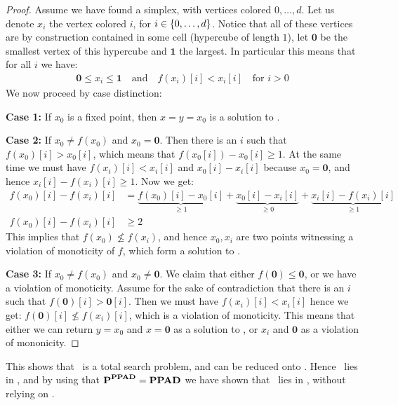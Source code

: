 \begin{proof}
    Assume we have found a simplex, with vertices colored $0, \dots, d$. Let us denote $x_i$ the vertex colored $i$, for $i \in \left\{0, \dots, d\right\}$. Notice that all of these vertices are by construction contained in some cell (hypercube of length $1$), let $\mathbf{0}$ be the smallest vertex of this hypercube and $\mathbf{1}$ the largest. In particular this means that for all $i$ we have:
    \begin{align*}
        \mathbf{0} \leq x_i \leq \mathbf{1} \quad \text{and} \quad f(x_i)[i] < x_i[i] \quad \text{for $i > 0$}
    \end{align*}
    We now proceed by case distinction:

    \textbf{Case 1:} If $x_0$ is a fixed point, then $x = y = x_0$ is a solution to \Tarskistar.

    \textbf{Case 2:} If $x_0 \neq f(x_0)$ and $x_0 = \mathbf{0}$. Then there is an $i$ such that $f(x_0)[i] > x_0[i]$, which means that $f(x_0[i]) - x_0[i] \geq 1$. At the same time we must have $f(x_i)[i] < x_i[i]$ and $x_0[i] - x_i[i]$ because $x_0 = \mathbf{0}$, and hence $x_i[i] - f(x_i)[i] \geq 1$. Now we get:
    \begin{align*}
        f(x_0)[i] - f(x_i)[i] & = \underbrace{f(x_0)[i] - x_0[i]}_{\geq 1} + \underbrace{x_0[i] - x_i[i]}_{\geq 0} + \underbrace{x_i[i] - f(x_i)[i]}_{\geq 1} \\
        f(x_0)[i] - f(x_i)[i] & \geq 2
    \end{align*}
    This implies that $f(x_0) \not \leq f(x_i)$, and hence $x_0, x_i$ are two points witnessing a violation of monoticity of $f$, which form a solution to \Tarskistar.

    \textbf{Case 3:} If $x_0 \neq f(x_0)$ and $x_0 \neq \mathbf{0}$. We claim that either $f(\mathbf{0}) \leq \mathbf{0}$, or we have a violation of monoticity. Assume for the sake of contradiction that there is an $i$ such that $f(\mathbf{0})[i] > \mathbf{0}[i]$. Then we must have $f(x_i)[i] < x_i[i]$ hence we get: $f(\mathbf{0})[i] \not\leq f(x_i)[i]$, which is a violation of monoticity. This means that either we can return $y = x_0$ and $x = \mathbf{0}$ as a solution to \Tarskistar, or $x_i$ and $\mathbf{0}$ as a violation of mononicity.
\end{proof}
This shows that \Tarskistar\ is a total search problem, and can be reduced onto \Sperner. Hence \Tarskistar\ lies in \PPAD, and by using that $\textbf{P}^{\textbf{PPAD}} = \textbf{PPAD}$ we have shown that \Tarski\ lies in \PPAD, without relying on \Brouwer.
